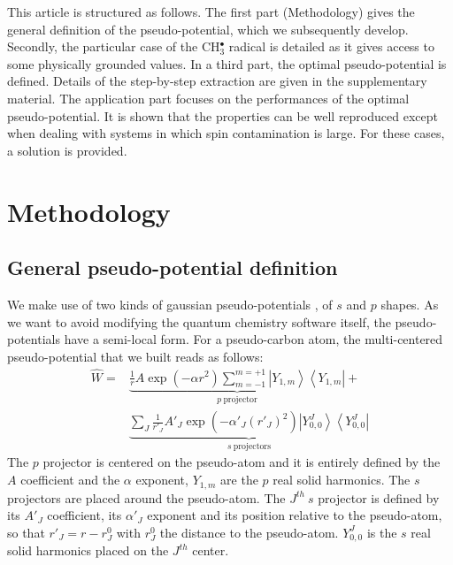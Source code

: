 \documentclass[aip]{revtex4-1}
\begin{document}
This article is structured as follows.
The first part (Methodology) gives the general definition of the pseudo-potential, which we subsequently develop.
Secondly, the particular case of the CH$_3^\bullet$ radical is detailed as it gives access
to some physically grounded values.
In a third part, the optimal pseudo-potential is defined. Details of the step-by-step extraction
are given in the supplementary material.
The application part focuses on the performances of the optimal pseudo-potential.
It is shown that the properties can be well reproduced except when dealing with
systems in which spin contamination is large.
For these cases, a solution is provided.

\section{Methodology}

\subsection{General pseudo-potential definition}

We make use of two kinds of gaussian pseudo-potentials \cite{me_structure_theory}, of \(s\) and \(p\) shapes. As we want to avoid modifying the quantum chemistry software itself, the pseudo-potentials have a semi-local form.
For a pseudo-carbon atom,
the multi-centered pseudo-potential that we built reads as follows:
\begin{align}
\label{eq:ourPP_init}
\hat{W} =&
\underbrace{\frac{1}{r} A\exp(-\alpha r^2)\sum_{m=-1}^{m=+1}\left|Y_{1,m}\right>\left<Y_{1,m}\right|}_{p \ \text{projector}}%
+\\
&\underbrace{\sum_J \frac{1}{r'_J} A'_J\exp(-\alpha'_J (r'_J)^2)\left|Y_{0,0}^J\right>\left<Y_{0,0}^J\right|}_{s \ \text{projectors}}%
\nonumber
\end{align}
The $p$ projector is centered on the pseudo-atom and it is entirely defined by the $A$ coefficient
and the $\alpha$ exponent, $Y_{1,m}$ are the $p$ real solid harmonics. The $s$ projectors are
placed around the pseudo-atom. The $J^{th} \ s$ projector is defined by its $A'_J$ coefficient, its
$\alpha'_J$ exponent and its position relative to the pseudo-atom, so that $r'_J = r-r^0_J$ with
$r^0_J$ the distance to the pseudo-atom. $Y_{0,0}^J$ is the $s$ real solid harmonics placed on
the $J^{th}$ center.
\end{document}
